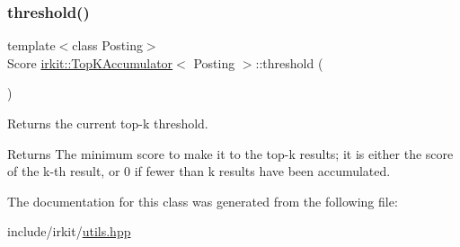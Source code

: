 \subsubsection{\texorpdfstring{threshold()}{threshold()}}
{\footnotesize\ttfamily template$<$class Posting$>$ \\
Score \mbox{\hyperlink{classirkit_1_1TopKAccumulator}{irkit\+::\+Top\+K\+Accumulator}}$<$ Posting $>$\+::threshold (\begin{DoxyParamCaption}{ }\end{DoxyParamCaption})\hspace{0.3cm}{\ttfamily [inline]}}



Returns the current top-\/k threshold. 

\begin{DoxyReturn}{Returns}
The minimum score to make it to the top-\/k results; it is either the score of the k-\/th result, or 0 if fewer than k results have been accumulated. 
\end{DoxyReturn}


The documentation for this class was generated from the following file\+:\begin{DoxyCompactItemize}
\item 
include/irkit/\mbox{\hyperlink{utils_8hpp}{utils.\+hpp}}\end{DoxyCompactItemize}
